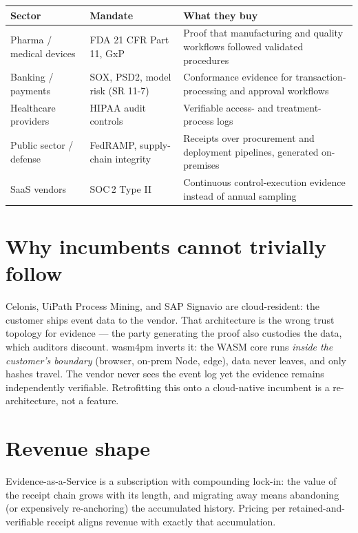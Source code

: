 \begin{center}
\begin{tabularx}{\textwidth}{lXX}
\toprule
\textbf{Sector} & \textbf{Mandate} & \textbf{What they buy} \\
\midrule
Pharma / medical devices & FDA 21 CFR Part 11, GxP & Proof that manufacturing and quality workflows followed validated procedures \\
Banking / payments & SOX, PSD2, model risk (SR 11-7) & Conformance evidence for transaction-processing and approval workflows \\
Healthcare providers & HIPAA audit controls & Verifiable access- and treatment-process logs \\
Public sector / defense & FedRAMP, supply-chain integrity & Receipts over procurement and deployment pipelines, generated on-premises \\
SaaS vendors & SOC\,2 Type II & Continuous control-execution evidence instead of annual sampling \\
\bottomrule
\end{tabularx}
\end{center}

\section{Why incumbents cannot trivially follow}

Celonis, UiPath Process Mining, and SAP Signavio are cloud-resident: the
customer ships event data to the vendor. That architecture is the wrong
trust topology for evidence --- the party generating the proof also custodies
the data, which auditors discount. wasm4pm inverts it: the WASM core runs
\emph{inside the customer's boundary} (browser, on-prem Node, edge), data
never leaves, and only hashes travel. The vendor never sees the event log
yet the evidence remains independently verifiable. Retrofitting this onto a
cloud-native incumbent is a re-architecture, not a feature.

\section{Revenue shape}

Evidence-as-a-Service is a subscription with compounding lock-in: the value
of the receipt chain grows with its length, and migrating away means
abandoning (or expensively re-anchoring) the accumulated history. Pricing
per retained-and-verifiable receipt aligns revenue with exactly that
accumulation.
